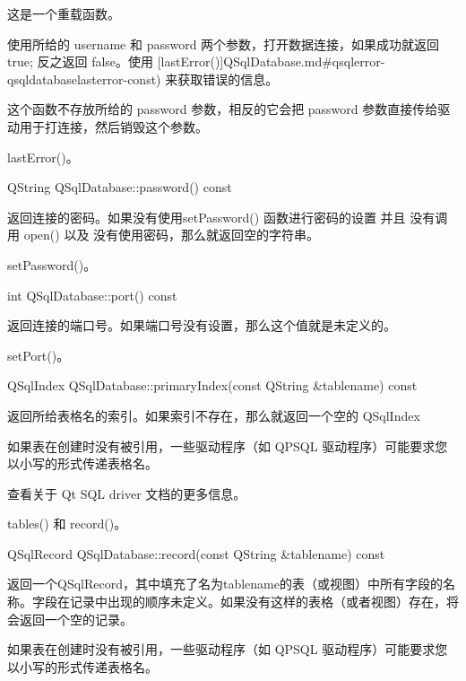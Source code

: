这是一个重载函数。

使用所给的 username 和 password 两个参数，打开数据连接，如果成功就返回 true; 反之返回 false。使用 [lastError()]QSqlDatabase.md\#qsqlerror-qsqldatabaselasterror-const) 来获取错误的信息。

这个函数不存放所给的 password 参数，相反的它会把 password 参数直接传给驱动用于打连接，然后销毁这个参数。

\begin{seeAlso}
lastError()。
\end{seeAlso}

QString QSqlDatabase::password() const


返回连接的密码。如果没有使用setPassword() 函数进行密码的设置 并且 没有调用 open() 以及 没有使用密码，那么就返回空的字符串。


\begin{seeAlso}
setPassword()。
\end{seeAlso}

int QSqlDatabase::port() const


返回连接的端口号。如果端口号没有设置，那么这个值就是未定义的。

\begin{seeAlso}
setPort()。
\end{seeAlso}

QSqlIndex QSqlDatabase::primaryIndex(const QString \&tablename) const


返回所给表格名的索引。如果索引不存在，那么就返回一个空的 QSqlIndex

\begin{notice}
如果表在创建时没有被引用，一些驱动程序（如 QPSQL 驱动程序）可能要求您以小写的形式传递表格名。
\end{notice}


查看关于 Qt SQL driver 文档的更多信息。

\begin{seeAlso}
tables() 和 record()。
\end{seeAlso}


QSqlRecord QSqlDatabase::record(const QString \&tablename) const


返回一个QSqlRecord，其中填充了名为tablename的表（或视图）中所有字段的名称。字段在记录中出现的顺序未定义。如果没有这样的表格（或者视图）存在，将会返回一个空的记录。

\begin{notice}
如果表在创建时没有被引用，一些驱动程序（如 QPSQL 驱动程序）可能要求您以小写的形式传递表格名。
\end{notice}


